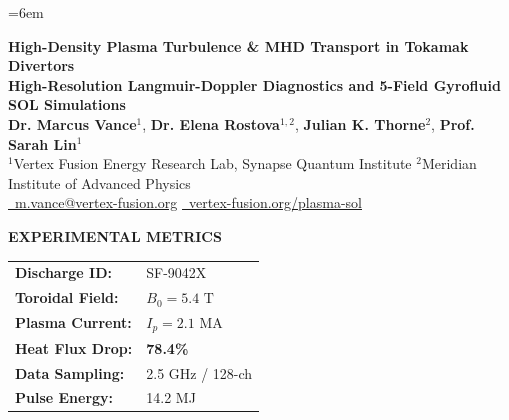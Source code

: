 \documentclass[landscape,a0,final]{a0poster}
\newlength{\colwidth}
\begin{document}
\setlength{\colwidth}{0.235\linewidth}%
\raggedright\emergencystretch=6em\relax
\color{TextDark}

\setlength{\abovedisplayskip}{4pt}
\setlength{\belowdisplayskip}{4pt}
\setlength{\abovedisplayshortskip}{2pt}
\setlength{\belowdisplayshortskip}{2pt}

\begin{tcolorbox}[
  enhanced,
  colback=NavyDark,
  colframe=CyanAccent,
  arc=6mm,
  boxrule=3.5pt,
  top=12pt,
  bottom=12pt,
  left=18pt,
  right=18pt,
  shadow={3mm}{-3mm}{0mm}{black!25}
]
  \begin{minipage}[c]{0.73\linewidth}
    {\VERYHuge \bfseries \color{white} High-Density Plasma Turbulence \& MHD Transport in Tokamak Divertors} \\[8pt]
    {\veryHuge \bfseries \color{CyanAccent} High-Resolution Langmuir-Doppler Diagnostics and 5-Field Gyrofluid SOL Simulations} \\[12pt]
    {\huge \color{white}
      \textbf{Dr. Marcus Vance}\(^{1}\), 
      \textbf{Dr. Elena Rostova}\(^{1,2}\), 
      \textbf{Julian K. Thorne}\(^{2}\), 
      \textbf{Prof. Sarah Lin}\(^{1}\)
    } \\[6pt]
    {\Large \color{SlateLight}
      \(^1\)Vertex Fusion Energy Research Lab, Synapse Quantum Institute \quad \textbullet \quad 
      \(^2\)Meridian Institute of Advanced Physics \\
      \href{mailto:m.vance@vertex-fusion.org}{\color{CyanAccent}\faEnvelope\ m.vance@vertex-fusion.org} \quad \textbullet \quad 
      \href{https://vertex-fusion.org}{\color{CyanAccent}\faGlobe\ vertex-fusion.org/plasma-sol}
    }
  \end{minipage}%
  \hfill
  \begin{minipage}[c]{0.25\linewidth}
    \begin{tcolorbox}[
      enhanced,
      colback=NavyDark!85!CyanAccent,
      colframe=CyanAccent,
      arc=4mm,
      boxrule=2pt,
      top=6pt,bottom=6pt,left=8pt,right=8pt
    ]
      \centering
      {\large \bfseries \color{white} EXPERIMENTAL METRICS} \\[4pt]
      \color{white}\small
      \begin{tabular}{ll}
        \textbf{Discharge ID:} & SF-9042X \\
        \textbf{Toroidal Field:} & \(B_0 = 5.4\text{ T}\) \\
        \textbf{Plasma Current:} & \(I_p = 2.1\text{ MA}\) \\
        \textbf{Heat Flux Drop:} & \color{EmeraldHighlight}\textbf{78.4\%} \\
        \textbf{Data Sampling:} & 2.5 GHz / 128-ch \\
        \textbf{Pulse Energy:} & 14.2 MJ
      \end{tabular}
    \end{tcolorbox}
  \end{minipage}
\end{tcolorbox}
\end{document}
